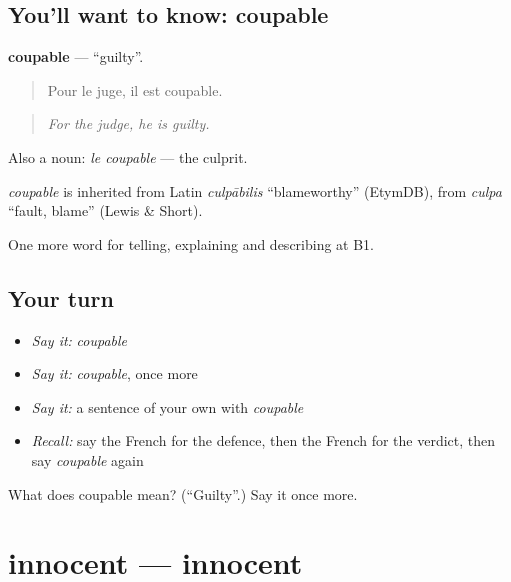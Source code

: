 \subsection*{You'll want to know: coupable}
\textbf{coupable} — \textquotedblleft{}guilty\textquotedblright{}.

\begin{quote}
Pour le juge, il est coupable.
\end{quote}

\begin{quote}
\emph{For the judge, he is guilty.}
\end{quote}

Also a noun: \emph{le coupable} — the culprit.

\begin{cousinweb}
\emph{coupable} is inherited from Latin \emph{culpābilis} \textquotedblleft{}blameworthy\textquotedblright{} (EtymDB), from \emph{culpa} \textquotedblleft{}fault, blame\textquotedblright{} (Lewis \& Short).
\end{cousinweb}

\begin{grammarlens}[title={What you've built}]
One more word for telling, explaining and describing at B1.
\end{grammarlens}

\subsection*{Your turn}
\begin{itemize}
\raggedright
  \item \emph{Say it:} \emph{coupable}
  \item \emph{Say it:} \emph{coupable}, once more
  \item \emph{Say it:} a sentence of your own with \emph{coupable}
  \item \emph{Recall:} say the French for the defence, then the French for the verdict, then say \emph{coupable} again
\end{itemize}

\begin{tcolorbox}[breakable,colback=teal!4,colframe=teal!35!black,title={Before you move on}]
What does coupable mean? (\textquotedblleft{}Guilty\textquotedblright{}.) Say it once more.
\end{tcolorbox}
\section[innocent]{innocent — innocent}


